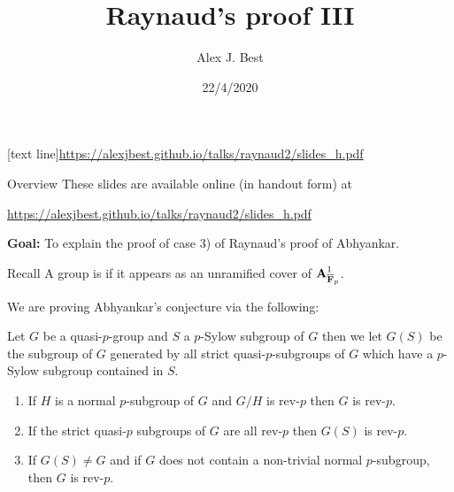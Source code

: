 \newcommand{\sheaf}[1]{\operatorname{\mathcal{#1}}}
\newcommand{\inv}{^{-1}}
\DeclareMathOperator{\ord}{ord}
\DeclareMathOperator{\divisor}{div}
\DeclareMathOperator{\Hom}{Hom}
\DeclareMathOperator{\coker}{coker}
\newcommand{\pair}[2]{\left\langle #1, #2 \right\rangle}
\DeclareMathOperator{\characteristic}{char}

\newcommand{\lb}{[}
\newcommand{\rb}{]}

\author{Alex J. Best}
\date{22/4/2020}
\title{Raynaud's proof III}
[text line]{\url{https://alexjbest.github.io/talks/raynaud2/slides_h.pdf}}


\begin{frame}
    \titlepage


\end{frame}


\begin{frame}{Overview}
    These slides are available online (in handout form) at

    {\url{https://alexjbest.github.io/talks/raynaud2/slides_h.pdf}}

    \pause

    \textbf{Goal:} To explain the proof of case 3) of Raynaud's proof of Abhyankar.

\end{frame}

\begin{frame}{Recall}
    A group is  if it appears as an unramified cover of $\operatorname{\mathbf{A}}^1_{\overline{\mathbf F}_p}$.

    We are proving Abhyankar's conjecture via the following:
    \begin{theorem}
        Let $G$ be a quasi-$p$-group and $S$ a $p$-Sylow subgroup of $G$ then we let $G(S)$ be the subgroup of $G$ generated by all strict quasi-$p$-subgroups of $G$ which have a $p$-Sylow subgroup contained in $S$.

        \begin{enumerate}
            \item If $H$ is a normal $p$-subgroup of $G$ and $G/H$ is rev-$p$ then $G$ is rev-$p$.\pause
            \item If the strict quasi-$p$ subgroups of $G$ are all rev-$p$ then $G(S)$ is rev-$p$.\pause
            \item If $G(S) \ne G$ and if $G$ does not contain a non-trivial normal $p$-subgroup, then $G$ is rev-$p$.\pause \qquad {\huge $\Leftarrow$}
        \end{enumerate}
    \end{theorem}
\end{frame}

